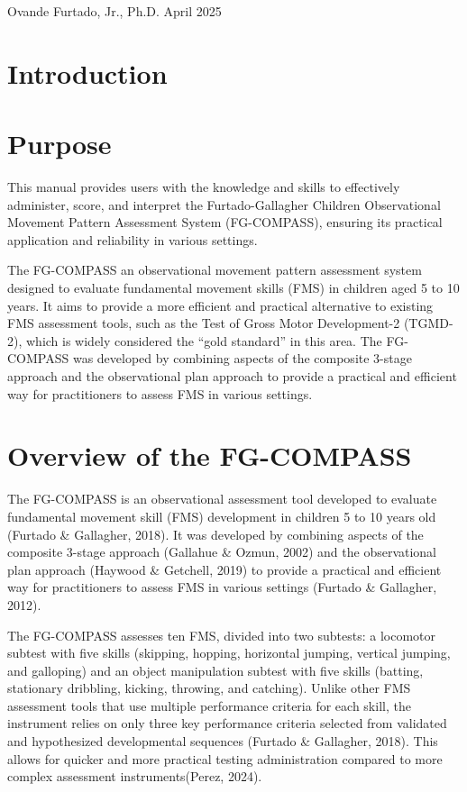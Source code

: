 \documentclass[
  letterpaper,
  DIV=11,
  numbers=noendperiod]{scrreprt}
\begin{document}
Ovande Furtado, Jr., Ph.D. April 2025


\chapter{Introduction}\label{introduction}


\chapter{Purpose}\label{purpose}

This manual provides users with the knowledge and skills to effectively
administer, score, and interpret the Furtado-Gallagher Children
Observational Movement Pattern Assessment System (FG-COMPASS), ensuring
its practical application and reliability in various settings.

The FG-COMPASS an observational movement pattern assessment system
designed to evaluate fundamental movement skills (FMS) in children aged
5 to 10 years. It aims to provide a more efficient and practical
alternative to existing FMS assessment tools, such as the Test of Gross
Motor Development-2 (TGMD-2), which is widely considered the ``gold
standard'' in this area. The FG-COMPASS was developed by combining
aspects of the composite 3-stage approach and the observational plan
approach to provide a practical and efficient way for practitioners to
assess FMS in various settings.


\chapter{Overview of the FG-COMPASS}\label{overview-of-the-fg-compass}

The FG-COMPASS is an observational assessment tool developed to evaluate
fundamental movement skill (FMS) development in children 5 to 10 years
old (Furtado \& Gallagher, 2018). It was developed by combining aspects
of the composite 3-stage approach (Gallahue \& Ozmun, 2002) and the
observational plan approach (Haywood \& Getchell, 2019) to provide a
practical and efficient way for practitioners to assess FMS in various
settings (Furtado \& Gallagher, 2012).

The FG-COMPASS assesses ten FMS, divided into two subtests: a locomotor
subtest with five skills (skipping, hopping, horizontal jumping,
vertical jumping, and galloping) and an object manipulation subtest with
five skills (batting, stationary dribbling, kicking, throwing, and
catching). Unlike other FMS assessment tools that use multiple
performance criteria for each skill, the instrument relies on only three
key performance criteria selected from validated and hypothesized
developmental sequences (Furtado \& Gallagher, 2018). This allows for
quicker and more practical testing administration compared to more
complex assessment instruments(Perez, 2024).
\end{document}
